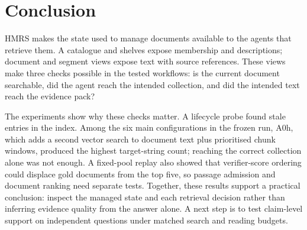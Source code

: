 \section{Conclusion}
\label{sec:conclusion}
HMRS makes the state used to manage documents available to the agents that
retrieve them. A catalogue and shelves expose membership and descriptions;
document and segment views expose text with source references. These views
make three checks possible in the tested workflows: is the current document
searchable, did the agent reach the intended collection, and did the intended
text reach the evidence pack?

The experiments show why these checks matter. A lifecycle probe found stale
entries in the index. Among the six main configurations in the frozen run, A0h, which adds
a second vector search to document text plus prioritised chunk windows,
produced the highest target-string count; reaching the correct collection alone was not enough. A fixed-pool
replay also showed that verifier-score ordering could displace gold documents
from the top five, so passage admission and document ranking need separate
tests. Together, these results support a practical conclusion: inspect the managed
state and each retrieval decision rather than inferring evidence quality from
the answer alone. A next step is to test claim-level support on independent
questions under matched search and reading budgets.
